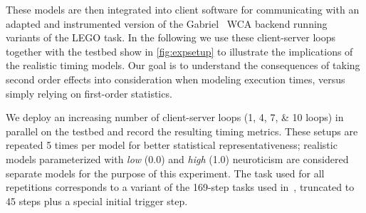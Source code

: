 These models are then integrated into client software for communicating with an adapted and instrumented version of the Gabriel~\cite{Chen2015LEGO,Chen2018application} \gls{WCA} backend running variants of the LEGO task.
In the following we use these client-server loops together with the testbed show in \cref{fig:expsetup} to illustrate the implications of the realistic timing models.
Our goal is to understand the consequences of taking second order effects into consideration when modeling execution times, versus simply relying on first-order statistics.


We deploy an increasing number of client-server loops (\numlist{1;4;7;10} loops) in parallel on the testbed and record the resulting timing metrics.
These setups are repeated \num{5} times per model for better statistical representativeness; realistic models parameterized with \emph{low} (\num{0.0}) and \emph{high} (\num{1.0}) neuroticism are considered separate models for the purpose of this experiment.
The task used for all repetitions corresponds to a variant of the \num{169}-step tasks used in~\cite{olguinmunoz:impact2021}, truncated to \num{45} steps plus a special initial trigger step. 

\medskip

